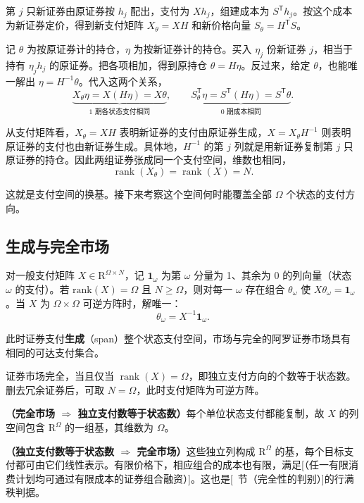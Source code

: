 第 $j$ 只新证券由原证券按 $h_j$ 配出，支付为 $Xh_j$，组建成本为 $S^{\mathsf T}h_j$。按这个成本为新证券定价，得到新支付矩阵 $X_\theta=XH$ 和新价格向量 $S_\theta=H^{\mathsf T}S$。

记 $\theta$ 为按原证券计的持仓，$\eta$ 为按新证券计的持仓。买入 $\eta_j$ 份新证券 $j$，相当于持有 $\eta_jh_j$ 的原证券。把各项相加，得到原持仓 $\theta=H\eta$。反过来，给定 $\theta$，也能唯一解出 $\eta=H^{-1}\theta$。代入这两个关系，
\[
 \underbrace{X_\theta\eta=X(H\eta)=X\theta}_{\text{1 期各状态支付相同}},
 \qquad
 \underbrace{S_\theta^{\mathsf T}\eta=S^{\mathsf T}(H\eta)=S^{\mathsf T}\theta}_{\text{0 期成本相同}}.
\]

从支付矩阵看，$X_\theta=XH$ 表明新证券的支付由原证券生成，$X=X_\theta H^{-1}$ 则表明原证券的支付也由新证券生成。具体地，$H^{-1}$ 的第 $j$ 列就是用新证券复制第 $j$ 只原证券的持仓。因此两组证券张成同一个支付空间，维数也相同，
\[
 \operatorname{rank}(X_\theta)=\operatorname{rank}(X)=N.
\]

这就是支付空间的换基。接下来考察这个空间何时能覆盖全部 $\Omega$ 个状态的支付方向。

\subsection{生成与完全市场}\label{sec:wj-four-complete}
对一般支付矩阵 $X\in\mathrm R^{\Omega\times N}$，记 $\mathbf{1}_\omega$ 为第 $\omega$ 分量为 1、其余为 0 的列向量（状态 $\omega$ 的支付）。若 $\mathrm{rank}(X)=\Omega$ 且 $N\ge\Omega$，则对每一 $\omega$ 存在组合 $\theta_\omega$ 使 $X\theta_\omega=\mathbf{1}_\omega$。当 $X$ 为 $\Omega\times\Omega$ 可逆方阵时，解唯一：
\[
    \theta_\omega=X^{-1}\mathbf{1}_\omega.
\]

此时证券支付\textbf{生成}（span）整个状态支付空间，市场与完全的阿罗证券市场具有相同的可达支付集合。

\begin{tcolorbox}[knowledge]
证券市场完全，当且仅当 $\operatorname{rank}(X)=\Omega$，即独立支付方向的个数等于状态数。删去冗余证券后，可取 $N=\Omega$，此时支付矩阵为可逆方阵。
\end{tcolorbox}

\textbf{（完全市场 $\Rightarrow$ 独立支付数等于状态数）}每个单位状态支付都能复制，故 $X$ 的列空间包含 $\mathrm R^\Omega$ 的一组基，其维数为 $\Omega$。

\textbf{（独立支付数等于状态数 $\Rightarrow$ 完全市场）}这些独立列构成 $\mathrm R^\Omega$ 的基，每个目标支付都可由它们线性表示。有限价格下，相应组合的成本也有限，满足[（任一有限消费计划均可通过有限成本的证券组合融资）]。这也是[~节（完全性的判别）]的行满秩判据。

